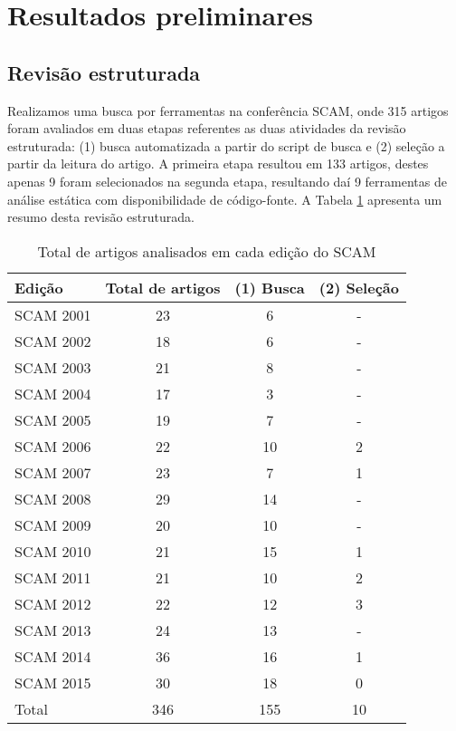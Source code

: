  \label{conclusoes}

\section{Resultados preliminares}

\subsection{Revisão estruturada}

Realizamos uma busca por ferramentas na conferência SCAM, onde 315 artigos
foram avaliados em duas etapas referentes as duas atividades da revisão
estruturada: (1) busca automatizada a partir do script de busca e (2) seleção
a partir da leitura do artigo. A primeira etapa resultou em 133 artigos,
destes apenas 9 foram selecionados na segunda etapa, resultando daí 9
ferramentas de análise estática com disponibilidade de código-fonte.
A Tabela \ref{artigos-do-scam} apresenta um resumo desta revisão estruturada.

\begin{table}[H]
\caption{Total de artigos analisados em cada edição do SCAM}
\centering
\begin{tabular}{| l | c | c | c |}
\hline
Edição    & Total de artigos & (1) Busca & (2) Seleção \\
\hline
SCAM 2001 & 23    & 6         & -           \\
SCAM 2002 & 18    & 6         & -           \\
SCAM 2003 & 21    & 8         & -           \\
SCAM 2004 & 17    & 3         & -           \\
SCAM 2005 & 19    & 7         & -           \\
SCAM 2006 & 22    & 10        & 2           \\
SCAM 2007 & 23    & 7         & 1           \\
SCAM 2008 & 29    & 14        & -           \\
SCAM 2009 & 20    & 10        & -           \\
SCAM 2010 & 21    & 15        & 1           \\
SCAM 2011 & 21    & 10        & 2           \\
SCAM 2012 & 22    & 12        & 3           \\
SCAM 2013 & 24    & 13        & -           \\
SCAM 2014 & 36    & 16        & 1           \\
SCAM 2015 & 30    & 18        & 0           \\
\hline
Total     & 346   & 155       & 10          \\
\hline
\end{tabular}
\label{artigos-do-scam}
\end{table}

